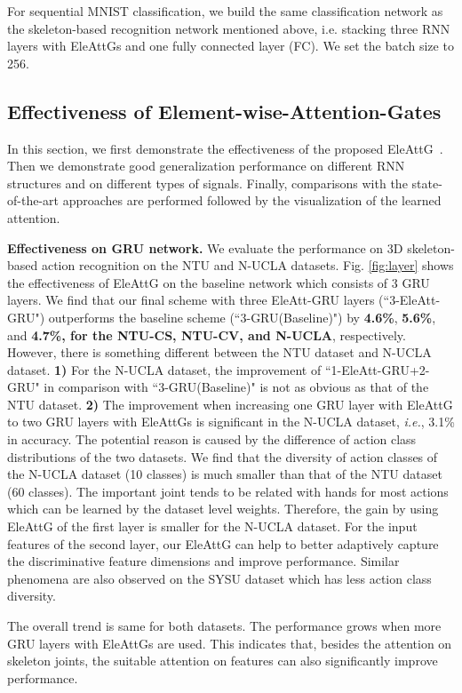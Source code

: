 \documentclass[journal]{IEEEtran}
\newcommand{\Outer}{Element-wise}
\newcommand{\EleAttGn}{{EleAttG}}
\newcommand{\EleAttG}{{EleAttG~}}
\begin{document}
For sequential MNIST classification, we build the same classification network as the skeleton-based recognition network mentioned above, i.e. stacking three RNN layers with {\EleAttGn}s and one fully connected layer (FC). We set the batch size to 256.


\subsection{Effectiveness of \Outer-Attention-Gates}

In this section, we first demonstrate the effectiveness of the proposed \EleAttG. Then we demonstrate good generalization performance on different RNN structures and on different types of signals. Finally, comparisons with the state-of-the-art approaches are performed followed by the visualization of the learned attention.

\textbf{Effectiveness on GRU network.} We evaluate the performance on 3D skeleton-based action recognition on the NTU and N-UCLA datasets. Fig. \ref{fig:layer} shows the effectiveness of {\EleAttGn} on the baseline network which consists of 3 GRU layers. We find that our final scheme with three EleAtt-GRU layers (``3-EleAtt-GRU") outperforms the baseline scheme (``3-GRU(Baseline)")  by {\bf{4.6\%}}, {\bf{5.6\%}}, and {\bf{4.7\%}, for the NTU-CS, NTU-CV, and N-UCLA}, respectively. However, there is something different between the NTU dataset and N-UCLA dataset. \textbf{1)} For the N-UCLA dataset, the improvement of ``1-EleAtt-GRU+2-GRU" in comparison with ``3-GRU(Baseline)"  is not as obvious as that of the NTU dataset. \textbf{2)} The improvement when increasing one GRU layer with EleAttG to two GRU layers with EleAttGs is significant in the N-UCLA dataset, {\it i.e.}, 3.1\% in accuracy. The potential reason is caused by the difference of action class distributions of the two datasets. We find that the diversity of action classes of the N-UCLA dataset (10 classes) is much smaller than that of the NTU dataset (60 classes). The important joint tends to be related with hands for most actions which can be learned by the dataset level weights. Therefore, the gain by using EleAttG of the first layer is smaller for the N-UCLA dataset. For the input features of the second layer, our EleAttG can help to better adaptively capture the discriminative feature dimensions and improve performance. Similar phenomena are also observed on the SYSU dataset which has less action class diversity.

The overall trend is same for both datasets. The performance grows when more GRU layers with EleAttGs are used. This indicates that, besides the attention on skeleton joints, the suitable attention on features can also significantly improve performance.
\end{document}
